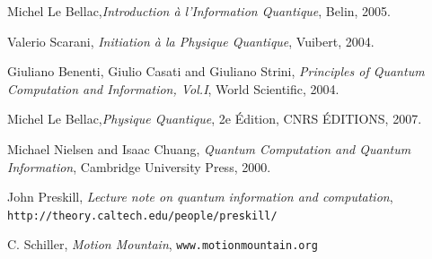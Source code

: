 \documentclass[12pt,a4paper,oneside,openany]{book}%
\numberwithin{equation}{section}
\numberwithin{figure}{section}
\numberwithin{table}{section}
\begin{document}
\appendix










\backmatter


\begin{thebibliography}{99999999}


Michel Le Bellac,\emph{Introduction à l'Information
Quantique}, Belin, 2005.

Valerio Scarani, \emph{Initiation à la Physique
Quantique}, Vuibert, 2004.

Giuliano Benenti, Giulio Casati and Giuliano Strini,
\emph{Principles of Quantum Computation and Information, Vol.I}, World
Scientific, 2004.

Michel Le Bellac,\emph{Physique Quantique}, 2e
Édition, CNRS ÉDITIONS, 2007.

Michael Nielsen and Isaac Chuang, \emph{Quantum
Computation and Quantum Information}, Cambridge University Press, 2000.

John Preskill, \emph{Lecture note on quantum
information and computation},
\texttt{http://theory.caltech.edu/people/preskill/}

C. Schiller, \emph{Motion Mountain},
\texttt{www.motionmountain.org}
\end{thebibliography}
\end{document}
